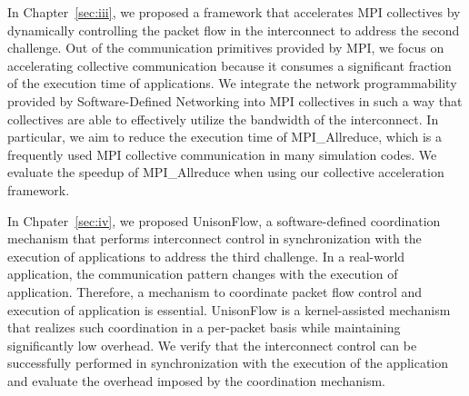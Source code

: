 In Chapter~\ref{sec:iii}, we proposed a framework that accelerates MPI
collectives by dynamically controlling the packet flow in the interconnect to
address the second challenge. Out of the communication primitives provided by
MPI, we focus on accelerating collective communication because it consumes a
significant fraction of the execution time of applications. We integrate the
network programmability provided by Software-Defined Networking into MPI
collectives in such a way that collectives are able to effectively utilize the
bandwidth of the interconnect. In particular, we aim to reduce the execution
time of MPI\_Allreduce, which is a frequently used MPI collective
communication in many simulation codes. We evaluate the speedup of
MPI\_Allreduce when using our collective acceleration framework.

In Chpater~\ref{sec:iv}, we proposed UnisonFlow, a software-defined
coordination mechanism that performs interconnect control in synchronization
with the execution of applications to address the third challenge. In a
real-world application, the communication pattern changes with the execution
of application. Therefore, a mechanism to coordinate packet flow control and
execution of application is essential. UnisonFlow is a kernel-assisted
mechanism that realizes such coordination in a per-packet basis while
maintaining significantly low overhead. We verify that the interconnect
control can be successfully performed in synchronization with the execution of
the application and evaluate the overhead imposed by the coordination
mechanism.
